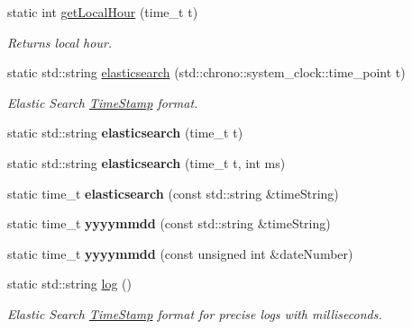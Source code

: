\begin{DoxyCompactItemize}
\item 
\hypertarget{classTimeStamp_aabcdf6d992a680d9da815f0a78683e59}{
static int \hyperlink{classTimeStamp_aabcdf6d992a680d9da815f0a78683e59}{getLocalHour} (time\_\-t t)}
\label{classTimeStamp_aabcdf6d992a680d9da815f0a78683e59}

\begin{DoxyCompactList}\small\item\em Returns local hour. \item\end{DoxyCompactList}\item 
\hypertarget{classTimeStamp_a456d0271b13636d11d6871bafe4c7f62}{
static std::string \hyperlink{classTimeStamp_a456d0271b13636d11d6871bafe4c7f62}{elasticsearch} (std::chrono::system\_\-clock::time\_\-point t)}
\label{classTimeStamp_a456d0271b13636d11d6871bafe4c7f62}

\begin{DoxyCompactList}\small\item\em Elastic Search \hyperlink{classTimeStamp}{TimeStamp} format. \item\end{DoxyCompactList}\item 
\hypertarget{classTimeStamp_a0e829646c9d7366ba987f977a42ab191}{
static std::string {\bfseries elasticsearch} (time\_\-t t)}
\label{classTimeStamp_a0e829646c9d7366ba987f977a42ab191}

\item 
\hypertarget{classTimeStamp_abe1a70441d20385f4ca4ddec07ef9342}{
static std::string {\bfseries elasticsearch} (time\_\-t t, int ms)}
\label{classTimeStamp_abe1a70441d20385f4ca4ddec07ef9342}

\item 
\hypertarget{classTimeStamp_a8e8f74521e03cabed287f5ffffd4d518}{
static time\_\-t {\bfseries elasticsearch} (const std::string \&timeString)}
\label{classTimeStamp_a8e8f74521e03cabed287f5ffffd4d518}

\item 
\hypertarget{classTimeStamp_ae61c2b60ddae2ef62051af03b6ca387e}{
static time\_\-t {\bfseries yyyymmdd} (const std::string \&timeString)}
\label{classTimeStamp_ae61c2b60ddae2ef62051af03b6ca387e}

\item 
\hypertarget{classTimeStamp_a14f4c3194f3e3caec6082eb00a6f0263}{
static time\_\-t {\bfseries yyyymmdd} (const unsigned int \&dateNumber)}
\label{classTimeStamp_a14f4c3194f3e3caec6082eb00a6f0263}

\item 
\hypertarget{classTimeStamp_ac18cb68d8341ea6d2c551b1ad5781394}{
static std::string \hyperlink{classTimeStamp_ac18cb68d8341ea6d2c551b1ad5781394}{log} ()}
\label{classTimeStamp_ac18cb68d8341ea6d2c551b1ad5781394}

\begin{DoxyCompactList}\small\item\em Elastic Search \hyperlink{classTimeStamp}{TimeStamp} format for precise logs with milliseconds. \item\end{DoxyCompactList}\end{DoxyCompactItemize}


